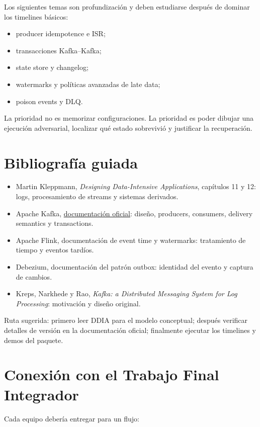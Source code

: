 \documentclass[variant=apuntes,cover=institutional,mode=screen]{ua-engineering-v6-article}
\begin{document}
Los siguientes temas son profundización y deben estudiarse después de dominar los timelines básicos:

\begin{itemize}
\item producer idempotence e ISR;
\item transacciones Kafka--Kafka;
\item state store y changelog;
\item watermarks y políticas avanzadas de late data;
\item poison events y DLQ.
\end{itemize}

La prioridad no es memorizar configuraciones. La prioridad es poder dibujar una ejecución adversarial, localizar qué estado sobrevivió y justificar la recuperación.

\section{Bibliografía guiada}

\begin{itemize}
\item Martin Kleppmann, \emph{Designing Data-Intensive Applications}, capítulos 11 y 12: logs, procesamiento de streams y sistemas derivados.
\item Apache Kafka, \href{https://kafka.apache.org/documentation/}{documentación oficial}: diseño, producers, consumers, delivery semantics y transactions.
\item Apache Flink, documentación de event time y watermarks: tratamiento de tiempo y eventos tardíos.
\item Debezium, documentación del patrón outbox: identidad del evento y captura de cambios.
\item Kreps, Narkhede y Rao, \emph{Kafka: a Distributed Messaging System for Log Processing}: motivación y diseño original.
\end{itemize}

Ruta sugerida: primero leer DDIA para el modelo conceptual; después verificar detalles de versión en la documentación oficial; finalmente ejecutar los timelines y demos del paquete.

\section{Conexión con el Trabajo Final Integrador}

Cada equipo debería entregar para un flujo:
\end{document}
